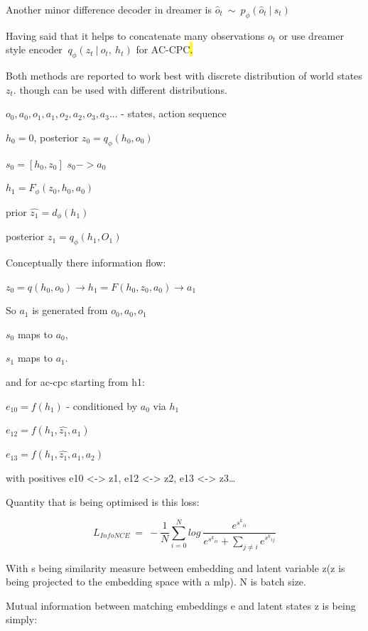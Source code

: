Another minor difference decoder in dreamer is ${\widehat{o}}_{t}\  \sim \ p_{\phi}({\widehat{o}}_{t}\ |\ s_{t})$

Having said that it helps to concatenate many observations $o_{t}$ or use dreamer style encoder $\ q_{\phi}(z_{t}\ |\ o_{t},\ h_{t})$ for AC-CPC\hl{.}

Both methods are reported to work best with discrete distribution of world states $z_{t}$. though can be used with different distributions.




$o_0, a_0, o_1, a_1, o_2, a_2, o_3, a_3...$ - states, action sequence

$h_0=0$, posterior $z_0 = q_ϕ(h_0, o_0)$

$s_0 = [ h_0, z_0] $
$s_0 -> a_0$

$h_1=F_ϕ(z_0, h_0, a_0)$

prior $\widehat{z_1} = d_ϕ(h_1)$

posterior $z_1 = q_ϕ(h_1, O_1)$



Conceptually there information flow:  

$z_0 = q(h_0, o_0) \rightarrow h_1 = F(h_0, z_0, a_0) \rightarrow a_1$  

So $a_1$ is generated from $o_0, a_0, o_1$

$s_0$ maps to $a_0$,  

$s_1$ maps to $a_1$.


and for ac-cpc starting from h1:

$e_{10} = f(h_1)$ - conditioned by $a_0$ via $h_1$

$e_{12} = f(h_1, \widehat{ z_1}, a_1)$

$e_{13} = f(h_1,  \widehat{ z_1}, a_1, a_2)$

with positives e10 \textless-\textgreater{} z1, e12 \textless-\textgreater{} z2, e13 \textless-\textgreater{} z3\ldots{}

Quantity that is being optimised is this loss:


\begin{equation}
L_{InfoNCE}\  = \  - \frac{1}{N} \sum_{i=0}^{N} log\ \frac{e^{{s^{k}}_{ii}}}{e^{{s^{k}}_{ii}}  + \sum_{j \neq i}^{}e^{{s^{k}}_{ij}}}
\end{equation}

With s being similarity measure between embedding and latent variable z(z is being projected to the embedding space with a mlp). N is batch size.

Mutual information between matching embeddings e and latent states z is being simply:

